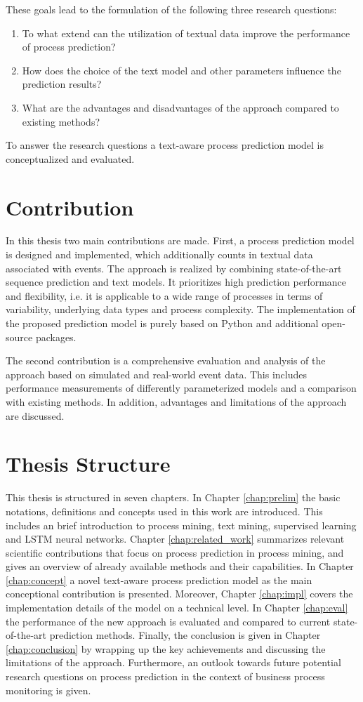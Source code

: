These goals lead to the formulation of the following three research questions:

\begin{enumerate}
	\item To what extend can the utilization of textual data improve the performance of process prediction?
	\item How does the choice of the text model and other parameters influence the prediction results?
	\item What are the advantages and disadvantages of the approach compared to existing methods?
\end{enumerate}

To answer the research questions a text-aware process prediction model is conceptualized and evaluated.

\section{Contribution}

In this thesis two main contributions are made.
First, a process prediction model is designed and implemented, which additionally counts in textual data associated with events.
The approach is realized by combining state-of-the-art sequence prediction and text models.
It prioritizes high prediction performance and flexibility, i.e. it is applicable to a wide range of processes in terms of variability, underlying data types and process complexity.
The implementation of the proposed prediction model is purely based on Python and additional open-source packages.

The second contribution is a comprehensive evaluation and analysis of the approach based on simulated and real-world event data.
This includes performance measurements of differently parameterized models and a comparison with existing methods.
In addition, advantages and limitations of the approach are discussed.

\section{Thesis Structure}

This thesis is structured in seven chapters.
In Chapter \ref{chap:prelim} the basic notations, definitions and concepts used in this work are introduced.
This includes an brief introduction to process mining, text mining, supervised learning and LSTM neural networks.
Chapter \ref{chap:related_work} summarizes relevant scientific contributions that focus on process prediction in process mining, and gives an overview of already available methods and their capabilities.
In Chapter \ref{chap:concept} a novel text-aware process prediction model as the main conceptional contribution is presented.
Moreover, Chapter \ref{chap:impl} covers the implementation details of the model on a technical level.
In Chapter \ref{chap:eval} the performance of the new approach is evaluated and compared to current state-of-the-art prediction methods.
Finally, the conclusion is given in Chapter \ref{chap:conclusion} by wrapping up the key achievements and discussing the limitations of the approach.
Furthermore, an outlook towards future potential research questions on process prediction in the context of business process monitoring is given.